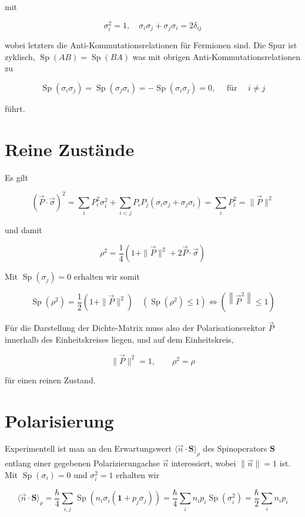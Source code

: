 \documentclass[10pt, letterpaper]{article}
\begin{document}
mit

$$
\sigma_{i}^{2}=1, \quad \sigma_{i} \sigma_{j}+\sigma_{j} \sigma_{i}=2 \delta_{i j}
$$

wobei letzters die Anti-Kommutationsrelationen für Fermionen sind. Die Spur ist zyklisch, $\operatorname{Sp}(A B)=\operatorname{Sp}(B A)$ was mit obrigen Anti-Kommutationsrelationen zu

$$
\operatorname{Sp}\left(\sigma_{i} \sigma_{j}\right)=\operatorname{Sp}\left(\sigma_{j} \sigma_{i}\right)=-\operatorname{Sp}\left(\sigma_{i} \sigma_{j}\right)=0, \quad \text { für } \quad i \neq j
$$

führt.

\section*{Reine Zustände}
Es gilt

$$
(\vec{P} \cdot \vec{\sigma})^{2}=\sum_{i} P_{i}^{2} \sigma_{i}^{2}+\sum_{i<j} P_{i} P_{j}\left(\sigma_{i} \sigma_{j}+\sigma_{j} \sigma_{i}\right)=\sum_{i} P_{i}^{2}=\|\vec{P}\|^{2}
$$

und damit

$$
\rho^{2}=\frac{1}{4}\left(1+\|\vec{P}\|^{2}+2 \vec{P} \cdot \vec{\sigma}\right)
$$

Mit $\operatorname{Sp}\left(\sigma_{j}\right)=0$ erhalten wir somit

$$
\operatorname{Sp}\left(\rho^{2}\right)=\frac{1}{2}\left(1+\|\vec{P}\|^{2}\right) \quad\left(\operatorname{Sp}\left(\rho^{2}\right) \leq 1\right) \Leftrightarrow\left(\left\|\vec{P}^{2}\right\| \leq 1\right)
$$

Für die Darstellung der Dichte-Matrix muss also der Polarisationsvektor $\vec{P}$ innerhalb des Einheitskreises liegen, und auf dem Einheitskreis,

$$
\|\vec{P}\|^{2}=1, \quad \quad \rho^{2}=\rho
$$

für einen reinen Zustand.

\section*{Polarisierung}
Experimentell ist man an den Erwartungswert $\langle\vec{n} \cdot \mathbf{S}\rangle_{\rho}$ des Spinoperators $\mathbf{S}$ entlang einer gegebenen Polarizierungachse $\vec{n}$ interessiert, wobei $\|\vec{n}\|=1$ ist. Mit $\operatorname{Sp}\left(\sigma_{i}\right)=0$ und $\sigma_{i}^{2}=1$ erhalten wir

$$
\langle\vec{n} \cdot \mathbf{S}\rangle_{\rho}=\frac{\hbar}{4} \sum_{i, j} \operatorname{Sp}\left(n_{i} \sigma_{i}\left(\mathbf{1}+p_{j} \sigma_{j}\right)\right)=\frac{\hbar}{4} \sum_{i} n_{i} p_{i} \operatorname{Sp}\left(\sigma_{i}^{2}\right)=\frac{\hbar}{2} \sum_{i} n_{i} p_{i}
$$
\end{document}
